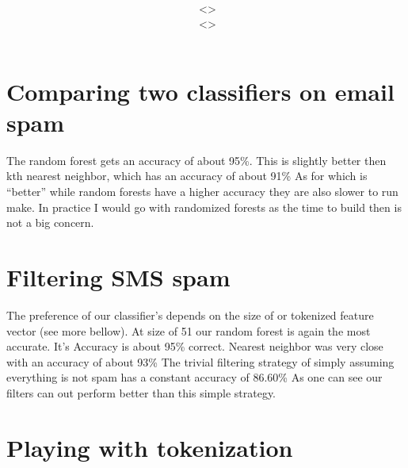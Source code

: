 \documentclass[12pt,a4paper]{article}
\title{\vspace{2in}\textmd{\hmwkClass\\\textbf{\hmwkTitle}}\\\normalsize\vspace{0.1in}\small{\hmwkDueDate}\\\vspace{4in}}
\date{}
\author{\textbf{\hmwkAuthorNameA} $\;$<\texttt{\href{mailto:laane2@illinois.edu}{\hmwkAuthorEmailA}}>\\\textbf{\hmwkAuthorNameB} $\;$<\texttt{\href{mailto:ruizcep2@illinois.edu}{\hmwkAuthorEmailB}}>}
\begin{document}
\begin{singlespace}

\begin{titlepage}
\maketitle
\thispagestyle{empty}
\end{titlepage}

\newpage


\clearpage

\section{Comparing two classifiers on email spam}


The random forest gets an accuracy of about 95\%.
This is slightly better then kth nearest neighbor, which has an accuracy of about 91\%
As for which is ``better'' while random forests have a higher accuracy they are also slower to run make. In practice I would go with randomized forests as the time to build then is not a big concern.


\newpage
\section{Filtering SMS spam}



The preference of our classifier's depends on the size of or tokenized feature vector (see more bellow). At size of 51 our random forest is again the most accurate.
It's Accuracy is about 95\% correct. 
Nearest neighbor was very close with an accuracy of about 93\%
The trivial filtering strategy of simply assuming everything is not spam has a constant accuracy of 86.60\% As one can see our filters can out perform better than this simple strategy. 


\newpage
\section{Playing with tokenization}




\end{singlespace}
\end{document}
